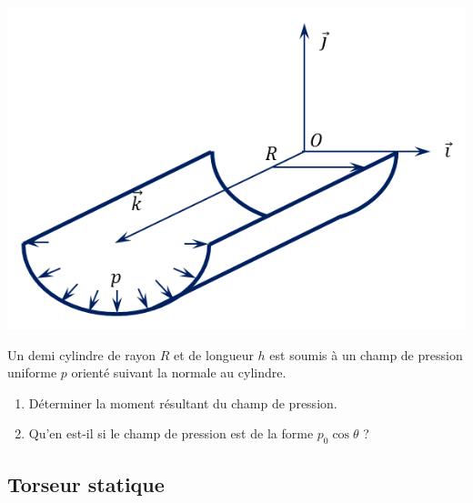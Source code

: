 \documentclass[10pt]{article}
\begin{document}
\begin{exemple}
\begin{minipage}[c]{.3\linewidth}
\begin{center}
\includegraphics[width=\textwidth]{images/cyl_p}
\end{center}
\end{minipage}
\hfill
\begin{minipage}[c]{.65\linewidth}
Un demi cylindre de rayon $R$ et de longueur $h$ est soumis à un champ de pression uniforme $p$ orienté suivant la normale au cylindre. 

\begin{enumerate}
\item Déterminer la moment résultant du champ de pression.  
\item Qu'en est-il si le champ de pression est de la forme $p_0 \cos \theta$ ?
\end{enumerate}


\end{minipage}

\end{exemple}

\subsection{Torseur statique}
\end{document}
